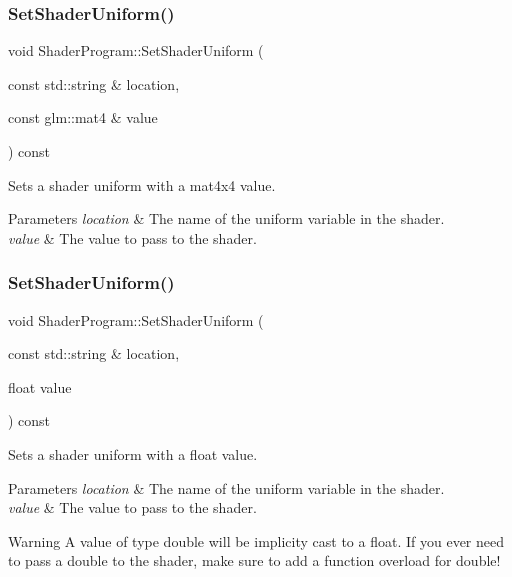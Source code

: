 \subsubsection{\texorpdfstring{Set\+Shader\+Uniform()}{SetShaderUniform()}\hspace{0.1cm}{\footnotesize\ttfamily [1/4]}}
{\footnotesize\ttfamily void Shader\+Program\+::\+Set\+Shader\+Uniform (\begin{DoxyParamCaption}\item[{const std\+::string \&}]{location,  }\item[{const glm\+::mat4 \&}]{value }\end{DoxyParamCaption}) const}



Sets a shader uniform with a mat4x4 value. 


\begin{DoxyParams}{Parameters}
{\em location} & The name of the uniform variable in the shader. \\
\hline
{\em value} & The value to pass to the shader. \\
\hline
\end{DoxyParams}
\hypertarget{class_shader_program_a7ffbc023f4bb3ae2c8b458eb7182dff0}{}\label{class_shader_program_a7ffbc023f4bb3ae2c8b458eb7182dff0} 
\subsubsection{\texorpdfstring{Set\+Shader\+Uniform()}{SetShaderUniform()}\hspace{0.1cm}{\footnotesize\ttfamily [2/4]}}
{\footnotesize\ttfamily void Shader\+Program\+::\+Set\+Shader\+Uniform (\begin{DoxyParamCaption}\item[{const std\+::string \&}]{location,  }\item[{float}]{value }\end{DoxyParamCaption}) const}



Sets a shader uniform with a float value. 


\begin{DoxyParams}{Parameters}
{\em location} & The name of the uniform variable in the shader. \\
\hline
{\em value} & The value to pass to the shader. \\
\hline
\end{DoxyParams}
\begin{DoxyWarning}{Warning}
A value of type double will be implicity cast to a float. If you ever need to pass a double to the shader, make sure to add a function overload for double! 
\end{DoxyWarning}
\hypertarget{class_shader_program_a16164eb7e3f1e2ca9bf60c492e43b4df}{}\label{class_shader_program_a16164eb7e3f1e2ca9bf60c492e43b4df} 
